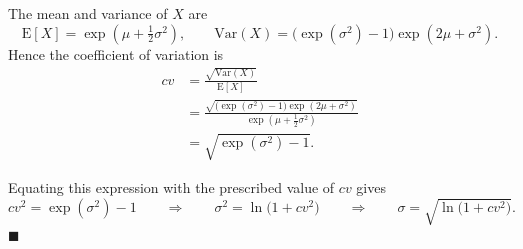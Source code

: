 \documentclass[a4paper,fleqn]{cas-sc}
\begin{document}
The mean and variance of $X$ are
\[
\mathrm{E}[X] = \exp\!\left(\mu + \tfrac{1}{2}\sigma^{2}\right),
\qquad
\mathrm{Var}(X) = \bigl(\exp(\sigma^{2}) - 1\bigr)\exp\!\left(2\mu + \sigma^{2}\right).
\]
Hence the coefficient of variation is
\[
\begin{aligned}
cv
&= \frac{\sqrt{\mathrm{Var}(X)}}{\mathrm{E}[X]} \\
&= \frac{\sqrt{\bigl(\exp(\sigma^{2}) - 1\bigr)\exp(2\mu + \sigma^{2})}}
        {\exp(\mu + \tfrac{1}{2}\sigma^{2})} \\
&= \sqrt{\exp(\sigma^{2}) - 1}.
\end{aligned}
\]

Equating this expression with the prescribed value of $cv$ gives
\[
cv^{2} = \exp(\sigma^{2}) - 1
\qquad\Longrightarrow\qquad
\sigma^{2} = \ln\!\bigl(1 + cv^{2}\bigr)
\qquad\Longrightarrow\qquad
\sigma = \sqrt{\ln\!\bigl(1 + cv^{2}\bigr)}.
\]
\hfill$\blacksquare$




\end{document}
